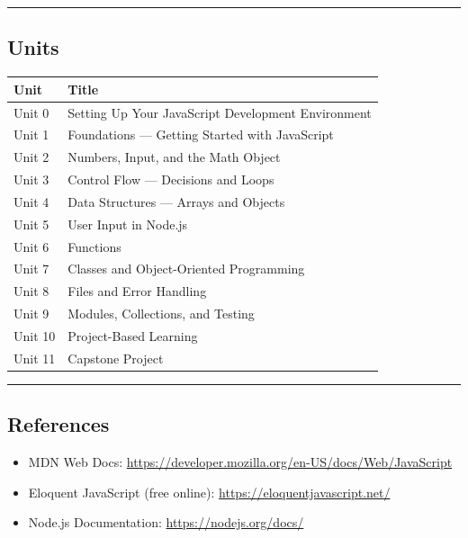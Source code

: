 \documentclass[
  justified,
  openright,
]{tufte-book}
\providecommand{\tightlist}{%
  \setlength{\itemsep}{0pt}\setlength{\parskip}{0pt}}
\begin{document}
\begin{center}\rule{0.5\linewidth}{0.5pt}\end{center}

\subsection{Units}\label{units}

{\def\LTcaptype{none} %
\begin{longtable}[]{@{}ll@{}}
\toprule\noalign{}
Unit & Title \\
\midrule\noalign{}
\endhead
\bottomrule\noalign{}
\endlastfoot
Unit 0 & Setting Up Your JavaScript Development Environment \\
Unit 1 & Foundations --- Getting Started with JavaScript \\
Unit 2 & Numbers, Input, and the Math Object \\
Unit 3 & Control Flow --- Decisions and Loops \\
Unit 4 & Data Structures --- Arrays and Objects \\
Unit 5 & User Input in Node.js \\
Unit 6 & Functions \\
Unit 7 & Classes and Object-Oriented Programming \\
Unit 8 & Files and Error Handling \\
Unit 9 & Modules, Collections, and Testing \\
Unit 10 & Project-Based Learning \\
Unit 11 & Capstone Project \\
\end{longtable}
}

\begin{center}\rule{0.5\linewidth}{0.5pt}\end{center}

\subsection{References}\label{references}

\begin{itemize}
\tightlist
\item
  MDN Web Docs:
  \url{https://developer.mozilla.org/en-US/docs/Web/JavaScript}
\item
  Eloquent JavaScript (free online):
  \url{https://eloquentjavascript.net/}
\item
  Node.js Documentation: \url{https://nodejs.org/docs/}
\end{itemize}
\end{document}
